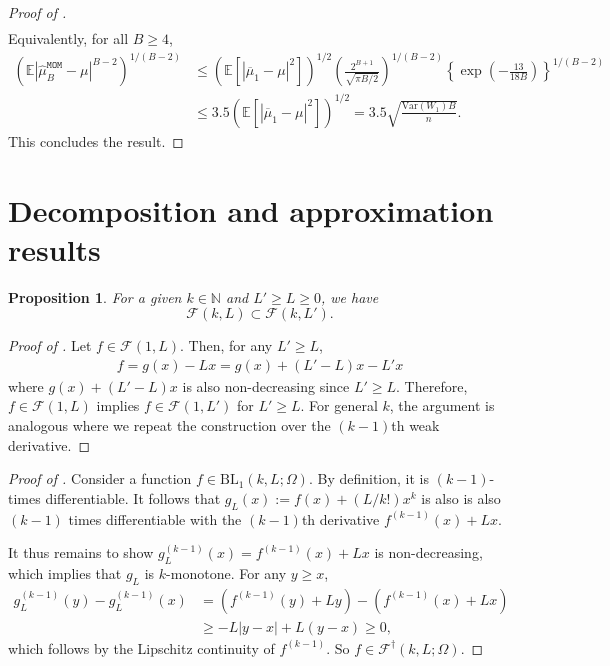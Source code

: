 \documentclass[12pt]{article}
\newtheorem{proposition}[theorem]{Proposition}
\begin{document}
\begin{appendices}
\begin{proof}[Proof of ]
\begin{align*}
    \end{align*}
    Equivalently, for all $B \ge 4$,
    \begin{align*}
         \left(\mathbb{E}|\widehat{\mu}_B^{\mathtt{MOM}} - \mu|^{B - 2}\right)^{1/(B - 2)} &\le (\mathbb{E}[|\overline{\mu}_1 - \mu|^2])^{1/2}\left(\frac{2^{B+1}}{\sqrt{\pi B/2}}\right)^{1/(B - 2)} \left\{\exp\left(-\frac{13}{18B}\right)\right\}^{1/(B-2)}\\
         &\le 3.5(\mathbb{E}[|\overline{\mu}_1 - \mu|^2])^{1/2} = 3.5\sqrt{\frac{\mathrm{Var}(W_1)B}{n}}.
    \end{align*}
    This concludes the result.
\end{proof}

\newpage
\section{Decomposition and approximation results}\label{appsec:auxiliary-results}

\begin{proposition}\label{lemma: F_nested}For a given $k\in\mathbb{N}$ and $L'\geq L \geq 0$, we have 
\begin{equation*}
    \mathcal{F}(k,L) \subset \mathcal{F}(k,L'). 
\end{equation*}
\end{proposition}
\begin{proof}[Proof of ]
    Let $f \in \mathcal{F}(1, L)$. Then, for any $L' \ge L$,
    \begin{align*}
        f = g(x) - Lx =  g(x) + (L' - L) x-L'x 
    \end{align*}
    where $g(x) + (L' - L) x$ is also non-decreasing since $L' \ge L$. Therefore, $f \in \mathcal{F}(1, L)$ implies $f \in \mathcal{F}(1, L')$ for $L' \ge L$. For general $k$, the argument is analogous where we repeat the construction over the $(k-1)$th weak derivative. 
\end{proof}



\begin{proof}[Proof of ]
Consider a function $f\in \mathrm{BL}_1(k,L;\Omega)$. By definition, it is $(k-1)$-times differentiable. It follows that $g_L(x):=f(x)+(L / k!) x^k$ is also is also $(k-1)$ times differentiable with the $(k-1)$th derivative $f^{(k-1)}(x) + L x$. 
    
It thus remains to show $g_{L}^{(k-1)}(x)= f^{(k-1)}(x)+ L x$ is non-decreasing, which implies that $g_{L}$ is $k$-monotone. For any $y \ge x$,
    \begin{align*}
        g^{(k-1)}_{L}(y) - g^{(k-1)}_{L}(x) &= \left(f^{(k-1)}(y) + L y\right) - \left(f^{(k-1)}(x) + L x\right) \\
        &\ge -L |y-x| +L(y-x) \ge 0,
    \end{align*}
    which follows by the Lipschitz continuity of $f^{(k-1)}$. So $f\in \mathcal{F}^\dagger(k,L;\Omega)$.
    

\end{proof}
\end{appendices}
\end{document}
